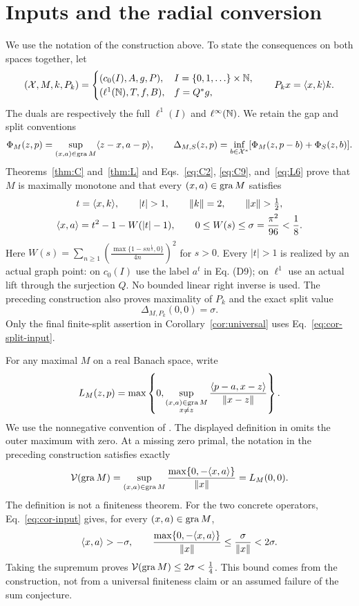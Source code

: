 \section{Inputs and the radial conversion}
We use the notation of the construction above. To state the consequences on both
spaces together, let
\[
(\mathcal X,M,k,P_k)=
\begin{cases}
(c_0(I),A,g,P),&I=\{0,1,\ldots\}\times\mathbb N,\\
(\ell^1(\mathbb N),T,f,B),&f=Q^*g,
\end{cases}
\qquad P_kx=\langle x,k\rangle k.
\]
The duals are respectively the full $\ell^1(I)$ and $\ell^\infty(\mathbb N)$.
We retain the gap and split conventions
\[
\Phi_M(z,p)=\sup_{(x,a)\in\operatorname{gra} M}\langle z-x,a-p\rangle,\qquad
\Delta_{M,S}(z,p)=\inf_{b\in\mathcal X^*}
       [\Phi_M(z,p-b)+\Phi_S(z,b)].
\]
Theorems~\ref{thm:C} and~\ref{thm:L} and
Eqs.~\eqref{eq:C2}, \eqref{eq:C9}, and~\eqref{eq:L6} prove
that $M$ is maximally monotone and that every $(x,a)\in\operatorname{gra} M$ satisfies
\begin{equation}
\begin{gathered}
t=\pair{x}{k},\qquad |t|>1,\qquad
\|k\|=2,\qquad \|x\|>\tfrac12,\\
\pair{x}{a}=t^2-1-W(|t|-1),\qquad
0\le W(s)\le\sigma=\frac{\pi^2}{96}<\frac18.
\end{gathered}
\label{eq:cor-input}
\end{equation}
Here $W(s)=\sum_{n\ge1}(\frac{\max\{1-sn^{\frac{1}{4}},0\}}{4n})^2$ for $s>0$.
Every $|t|>1$ is realized by an actual graph point: on $c_0(I)$ use the
label $a^t$ in Eq. (D9); on $\ell^1$ use an actual lift through the
surjection $Q$. No bounded linear right inverse is used. The preceding construction
also proves maximality of $P_k$ and the exact split value
\begin{equation}
\Delta_{M,P_k}(0,0)=\sigma.
\label{eq:cor-split-input}
\end{equation}
Only the final finite-split assertion in Corollary~\ref{cor:universal}
uses Eq.~\eqref{eq:cor-split-input}.

For any maximal $M$ on a real Banach space, write
\begin{equation}
L_M(z,p)=\max\left\{0,
\sup_{\substack{(x,a)\in\operatorname{gra} M\\x\ne z}}
\frac{\langle p-a,x-z\rangle}{\|x-z\|}\right\}.
\label{eq:cor-Verona}
\end{equation}
We use the nonnegative convention of \cite{verona2008}. The displayed
definition in \cite[Section~2]{verona2012} omits the outer maximum with
zero. At a missing zero primal, the notation in
the preceding construction satisfies exactly
\begin{equation}
\mathcal V(\operatorname{gra} M)=
\sup_{(x,a)\in\operatorname{gra} M}\frac{\max\{0,-\langle x,a\rangle\}}{\|x\|}
=L_M(0,0).
\label{eq:cor-V}
\end{equation}
The definition is not a finiteness theorem. For the two concrete
operators, Eq.~\eqref{eq:cor-input} gives, for every $(x,a)\in\operatorname{gra} M$,
\[
\langle x,a\rangle>-\sigma,\qquad
\frac{\max\{0,-\langle x,a\rangle\}}{\|x\|}
\le\frac{\sigma}{\|x\|}<2\sigma.
\]
Taking the supremum proves $\mathcal V(\operatorname{gra} M)\le2\sigma<\frac{1}{4}$.
This bound comes from the construction, not from a universal finiteness
claim or an assumed failure of the sum conjecture.

